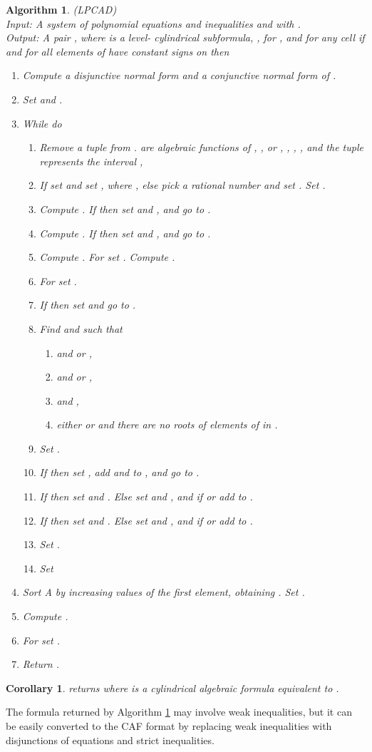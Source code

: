 \documentclass[english]{amsart}
\numberwithin{equation}{section}
\numberwithin{figure}{section}
\newtheorem{algorithm}[thm]{Algorithm}
\newtheorem{cor}[thm]{Corollary}
\begin{document}
\begin{algorithm}
\label{alg:LPCAD}(LPCAD)\\
Input:\emph{ A system } \emph{of polynomial
equations and inequalities and 
with .}\textup{}\\
\textup{\emph{Output:}}\textup{ }\emph{A pair , where 
is a level- cylindrical subformula, }\textup{}\emph{,
}\textup{}\emph{ for
, and for any cell  if
 and for  all elements of 
have constant signs on  then}\textup{\emph{ }}\textup{
}
\begin{enumerate}
\item Compute a disjunctive normal form  and a conjunctive normal
form  of .
\item Set  and .
\item While  do

\begin{enumerate}
\item Remove a tuple  from
.  are algebraic functions of ,
, or , , ,
, and the tuple represents the interval
,
\item If  set  and set , where ,
else pick a rational number  and set .
Set .
\item Compute . If 
then set  and ,
and go to .
\item Compute . If 
then set  and ,
and go to .
\item Compute . For  set .
Compute .
\item For  set .
\item If  then set  and go to .
\item Find and  such that 

\begin{enumerate}
\item  and  or , 
\item  and  or , 
\item  and , 
\item either  or  and there
are no roots of elements of  in . 
\end{enumerate}
\item Set .
\item If  then set , add 
 and 
 to , and go to .
\item If  then set  and .
Else set  and , and if 
or  add 
 to . 
\item If  then set  and .
Else set  and , and if 
or  add 
 to . 
\item Set .
\item Set 
\end{enumerate}
\item Sort A by increasing values of the first element, obtaining .
Set .
\item Compute .
\item For  set .
\item Return\emph{ .}
\end{enumerate}
\end{algorithm}
\begin{cor}
 returns 
where  is a cylindrical algebraic formula
equivalent to .
\end{cor}
The formula returned by Algorithm \ref{alg:LPCAD} may involve weak
inequalities, but it can be easily converted to the CAF format by
replacing weak inequalities with disjunctions of equations and strict
inequalities.
\end{document}
